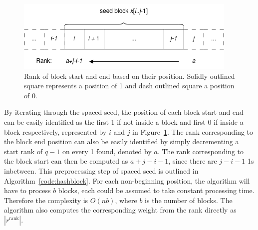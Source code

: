 \documentclass[twoside,a4paper,bsc]{master}
\begin{document}
\begin{figure}[t]
\begin{center}
\includegraphics[scale=0.5]{graphics/seedblock.png}
\end{center}
\caption{Rank of block start and end based on their position. Solidly outlined 
square represents a position of 1 and dash outlined square a position of 0.}
\label{fig:seedblock}
\end{figure}

By iterating through the spaced seed, the position of each block start and end 
can be easily identified as the first 1 if not inside a block and first 0 if 
inside a block respectively, represented by \(i\) and \(j\) in 
Figure~\ref{fig:seedblock}. The rank corresponding to the block end position 
can also be easily identified by simply decrementing a start rank of \(q-1\) on 
every 1 found, denoted by \(a\). The rank corresponding to the block start can 
then be computed as \(a+j-i-1\), since there are \(j-i-1\) 1s inbetween.
This preprocessing step of spaced seed is outlined in Algorithm~\ref{code:hashblock}.
For each non-beginning position, the algorithm will have to process \(b\)
blocks, each could be assumed to take constant processing time. Therefore the
complexity is \(O(nb)\), where \(b\) is the number of blocks. The algorithm also
computes the corresponding weight from the rank directly as \(|r^{\text{rank}}|\).
\end{document}
